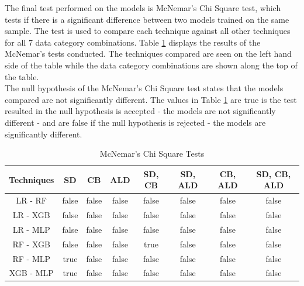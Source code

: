 The final test performed on the models is McNemar's Chi Square test, which tests if there is a significant difference between two models trained on the same sample. The test is used to compare each technique against all other techniques for all 7 data category combinations. Table \ref{table:Mcnemar} displays the results of the  McNemar's tests conducted. The techniques compared are seen on the left hand side of the table while the data category combinations are shown along the top of the table. \\

The null hypothesis of the McNemar's Chi Square test states that the models compared are not significantly different. The values in Table \ref{table:Mcnemar} are true is the test resulted in the null hypothesis is accepted - the models are not significantly different - and are false if the null hypothesis is rejected - the models are significantly different. 

\vspace{10pt}

\begin{table}[H]
\begin{center}
\begin{tabular}{|c|c|c|c|c|c|c|c|} 
\hline
\multicolumn{1}{|c|}{Techniques}
&\multicolumn{1}{|c|}{SD}
&\multicolumn{1}{|c|}{CB}
&\multicolumn{1}{|c|}{ALD}
&\multicolumn{1}{|c|}{SD, CB}
&\multicolumn{1}{|c|}{SD, ALD}
&\multicolumn{1}{|c|}{CB, ALD}
&\multicolumn{1}{|c|}{SD, CB, ALD}\\
\hline
LR - RF & false & false & false  & false & false &  false &  false \\
\hline
LR - XGB & false & false & false & false  & false & false & false \\
\hline
LR - MLP & false & false  & false & false & false & false & false \\
\hline
RF - XGB & false & false & false & true & false & false &  false \\
\hline
RF - MLP & true & false & false & false & false & false & false  \\
\hline
XGB - MLP & true & false & false & false & false & false &  false \\
\hline
\end{tabular}
\end{center}
\caption{McNemar's Chi Square Tests}
\label{table:Mcnemar}
\end{table}

\vspace{10pt}


